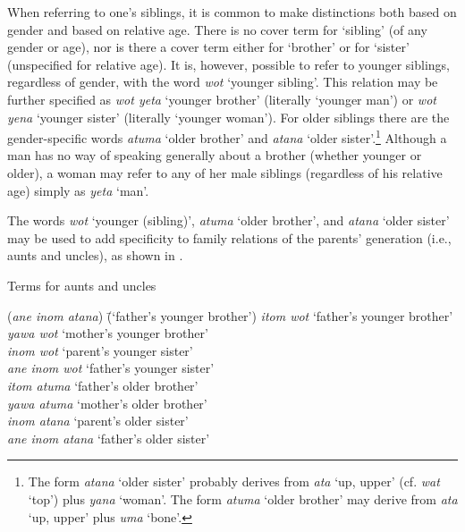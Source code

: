   When referring to one’s siblings, it is common to make distinctions both based on gender and based on relative age. There is no cover term for ‘sibling’ (of any gender or age), nor is there a cover term either for ‘brother’ or for ‘sister’ (unspecified for relative age). It is, however, possible to refer to younger siblings, regardless of gender, with the word \textit{wot} ‘younger sibling’. This relation may be further specified as \textit{wot yeta} ‘younger brother’ (literally ‘younger man’) or \textit{wot yena} ‘younger sister’ (literally ‘younger woman’). For older siblings there are the gender-specific words \textit{atuma} ‘older brother’ and \textit{atana} ‘older sister’.\footnote{The form \textit{atana} ‘older sister’ probably derives from \textit{ata} ‘up, upper’ (cf. \textit{wat} ‘top’) plus \textit{yana} ‘woman’. The form \textit{atuma} ‘older brother’ may derive from \textit{ata} ‘up, upper’ plus \textit{uma} ‘bone’.} Although a man has no way of speaking generally about a brother (whether younger or older), a woman may refer to any of her male siblings (regardless of his relative age) simply as \textit{yeta} ‘man’.

  The words \textit{wot} ‘younger (sibling)’, \textit{atuma} ‘older brother’, and \textit{atana} ‘older sister’ may be used to add specificity to family relations of the parents’ generation (i.e., aunts and uncles), as shown in .

\ea%
    \label{ex:sem:23}
          Terms for aunts and uncles
\begin{tabbing}
{(\textit{ane inom atana})} \= {(‘father’s younger brother’)}\kill
{\textit{itom wot}} \> {‘father’s younger brother’}\\
{\textit{yawa wot}} \> {‘mother’s younger brother’}\\
{\textit{inom wot}} \> {‘parent’s younger sister’}\\
{\textit{ane inom wot}} \> {‘father's younger sister’}\\
{\textit{itom atuma}} \> {‘father’s older brother’}\\
{\textit{yawa atuma}} \> {‘mother’s older brother’}\\
{\textit{inom atana}} \> {‘parent’s older sister’}\\
{\textit{ane inom atana}} \> {‘father’s older sister’}
\end{tabbing}
\z



